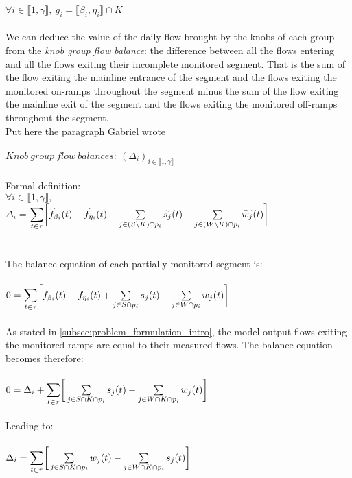 $\forall i \in \llbracket 1, \gamma \rrbracket,\ g_{i}=\llbracket \beta_{i}, \eta_{i} \rrbracket \cap K $\\
\\
We can deduce the value of the daily flow brought by the knobs of each group from the \emph{knob group flow balance}: the difference between all the flows entering and all the flows exiting their incomplete monitored segment. That is the sum of the flow exiting the mainline entrance of the segment and the flows exiting the monitored on-ramps throughout the segment minus the sum of the flow exiting the mainline exit of the segment and the flows exiting the monitored off-ramps throughout the segment. \\ 
\color{red}Put here the paragraph Gabriel wrote\color{black}\\
\\
$Knob\ group\ flow\ balances:\ (\Delta_{i})_{i\in \llbracket 1,\gamma \rrbracket} $\\
\\
Formal definition:\\
$\forall i \in \llbracket 1,\gamma \rrbracket,$\\
$\Delta_{i} =$\small $\mathlarger{\sum\limits_{t\in \tau}}\bigg[ \widetilde{f}_{\beta_{i}}(t)-\widetilde{f}_{\eta_{i}}(t)+\sum\limits_{j\in (S\backslash K)\cap p_{i}}\widetilde{s_{j}}(t)-\sum\limits_{j\in (W\backslash K)\cap p_{i}}\widetilde{w_{j}}(t)\bigg]$\normalsize 
\\
\\
\\
The balance equation of each partially monitored segment is:\\
\\
$0=\mathlarger{\sum\limits_{t\in \tau}}\bigg[f_{\beta_{i}}(t)-f_{\eta_{i}}(t)+\sum\limits_{j\in S\cap p_{i}}s_{j}(t)-\sum\limits_{j\in W\cap p_{i}}w_{j}(t)\bigg]$\\
\\
As stated in \ref{subsec:problem_formulation_intro}, the model-output flows exiting the monitored ramps are equal to their measured flows. The balance equation becomes therefore:\\
\\
$0=\Delta_{i}+\mathlarger{\sum\limits_{t\in \tau}}\bigg[\sum\limits_{j\in S\cap K\cap p_{i}}s_{j}(t)-\sum\limits_{j\in W\cap K\cap p_{i}}w_{j}(t)\bigg]$\\
\\
Leading to:\\
\\
$\Delta_{i}=\mathlarger{\sum\limits_{t\in \tau}}\bigg[\sum\limits_{j\in S\cap K\cap p_{i}}w_{j}(t)-\sum\limits_{j\in W\cap K\cap p_{i}}s_{j}(t)\bigg]$\\
